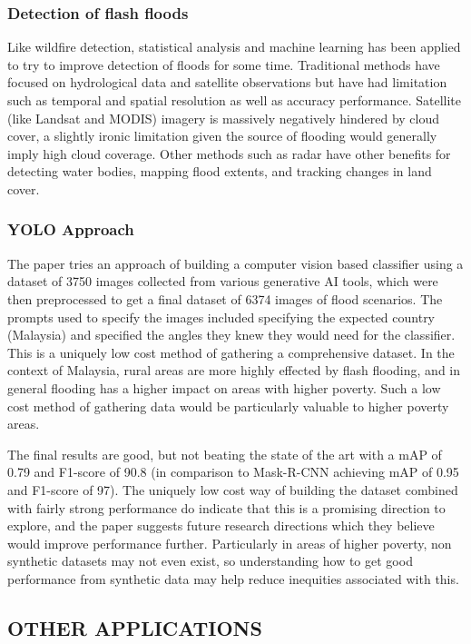 \documentclass[conference,a4paper]{IEEEtran}
\begin{document}
\subsubsection{Detection of flash floods}

Like wildfire detection, statistical analysis and machine learning has been applied to try to improve detection of floods for some time. Traditional methods have focused on hydrological data and satellite observations but have had limitation such as temporal and spatial resolution as well as accuracy performance. Satellite (like Landsat and MODIS) imagery is massively negatively hindered by cloud cover, a slightly ironic limitation given the source of flooding would generally imply high cloud coverage. Other methods such as radar have other benefits for detecting water bodies, mapping flood extents, and tracking changes in land cover.

\subsubsection{YOLO Approach}

The paper tries an approach of building a computer vision based classifier using a dataset of 3750 images collected from various generative AI tools, which were then preprocessed to get a final dataset of 6374 images of flood scenarios. The prompts used to specify the images included specifying the expected country (Malaysia) and specified the angles they knew they would need for the classifier. This is a uniquely low cost method of gathering a comprehensive dataset. In the context of Malaysia, rural areas are more highly effected by flash flooding, and in general flooding has a higher impact on areas with higher poverty. Such a low cost method of gathering data would be particularly valuable to higher poverty areas.

The final results are good, but not beating the state of the art with a mAP of 0.79 and F1-score of 90.8 (in comparison to Mask-R-CNN achieving mAP of 0.95 and F1-score of 97). The uniquely low cost way of building the dataset combined with fairly strong performance do indicate that this is a promising direction to explore, and the paper suggests future research directions which they believe would improve performance further. Particularly in areas of higher poverty, non synthetic datasets may not even exist, so understanding how to get good performance from synthetic data may help reduce inequities associated with this.


\subsection{OTHER APPLICATIONS}
\end{document}
